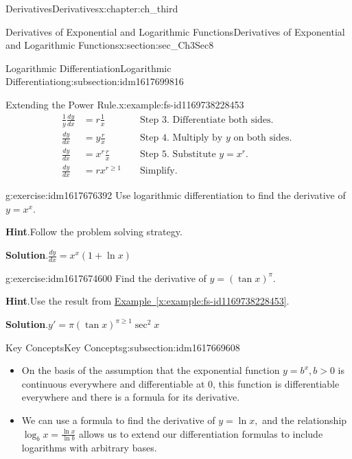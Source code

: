 \documentclass[oneside,10pt,]{book}
\newcommand{\blocktitlefont}{\relax}
\newcommand{\xreffont}{\relax}
\numberwithin{equation}{section}
\newcommand{\gt}{>}
\newcommand{\amp}{&}
\begin{document}
\begin{chapterptx}{Derivatives}{}{Derivatives}{}{}{x:chapter:ch_third}
\begin{sectionptx}{Derivatives of Exponential and Logarithmic Functions}{}{Derivatives of Exponential and Logarithmic Functions}{}{}{x:section:sec_Ch3Sec8}
\begin{subsectionptx}{Logarithmic Differentiation}{}{Logarithmic Differentiation}{}{}{g:subsection:idm1617699816}
\begin{example}{Extending the Power Rule.}{x:example:fs-id1169738228453}
\begin{align*}
\frac{1}{y} \frac{dy}{dx}\amp= r\frac{1}{x}\amp\amp\text{ Step 3. Differentiate both sides. }\\
\frac{dy}{dx}\amp=y\frac{r}{x}\amp\amp\text{ Step 4. Multiply by } y \text{ on both sides. }\\
\frac{dy}{dx}\amp=x^r\frac{r}{x}\amp\amp\text{ Step 5. Substitute } y=x^r.\\
\frac{dy}{dx}\amp= rx^{r\geq 1}\amp\amp\text{ Simplify. }
\end{align*}
\end{example}
\begin{inlineexercise}{}{g:exercise:idm1617676392}%
Use logarithmic differentiation to find the derivative of \(y=x^x.\)%
\par\smallskip%
\noindent\textbf{\blocktitlefont Hint}.\hypertarget{g:hint:idm1617676008}{}\quad{}Follow the problem solving strategy.%
\par\smallskip%
\noindent\textbf{\blocktitlefont Solution}.\hypertarget{g:solution:idm1617674728}{}\quad{}\(\frac{dy}{dx}=x^x(1+\ln  x)\)%
\end{inlineexercise}%
\begin{inlineexercise}{}{g:exercise:idm1617674600}%
Find the derivative of \(y=(\tan  x)^{\pi}.\)%
\par\smallskip%
\noindent\textbf{\blocktitlefont Hint}.\hypertarget{g:hint:idm1617669864}{}\quad{}Use the result from \hyperref[x:example:fs-id1169738228453]{Example~{\xreffont\ref{x:example:fs-id1169738228453}}}.%
\par\smallskip%
\noindent\textbf{\blocktitlefont Solution}.\hypertarget{g:solution:idm1617670760}{}\quad{}\(y'=\pi(\tan  x)^{\pi\geq 1}\sec^2x\)%
\end{inlineexercise}%
\end{subsectionptx}
%
%
\typeout{************************************************}
\typeout{************************************************}
%
\begin{subsectionptx}{Key Concepts}{}{Key Concepts}{}{}{g:subsection:idm1617669608}
%
\begin{itemize}[label=\textbullet]
\item{}On the basis of the assumption that the exponential function \(y=b^x,b\gt 0\) is continuous everywhere and differentiable at 0, this function is differentiable everywhere and there is a formula for its derivative.%
\item{}We can use a formula to find the derivative of \(y=\ln  x,\) and the relationship \(\log_bx=\frac{\ln  x}{\ln  b}\) allows us to extend our differentiation formulas to include logarithms with arbitrary bases.%

\end{itemize}
\end{subsectionptx}
\end{sectionptx}
\end{chapterptx}
\end{document}
